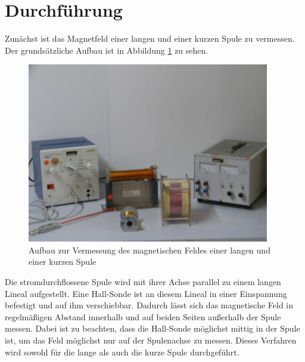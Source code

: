 \section{Durchführung}
\label{sec:Durchführung}
Zunächst ist das Magnetfeld einer langen und einer kurzen Spule zu vermessen.
Der grundsätzliche Aufbau ist in Abbildung \ref{fig:Aufbau_langekurzespule} zu sehen.
\begin{figure}
  \centering
  \includegraphics[width=300pt]{data/aufbau1.png}
  \caption{Aufbau zur Vermessung des magnetischen Feldes einer
  langen und einer kurzen Spule \cite{Versuchsanleitung}}
  \label{fig:Aufbau_langekurzespule}
\end{figure}
Die stromdurchflossene Spule wird mit ihrer Achse parallel zu einem langen Lineal
aufgestellt. Eine Hall-Sonde ist an diesem Lineal in einer Einspannung befestigt und
auf ihm verschiebbar. Dadurch lässt sich das magnetische Feld in regelmäßigen Abstand
innerhalb und auf beiden Seiten außerhalb der Spule messen. Dabei ist zu beachten, dass
die Hall-Sonde möglichst mittig in der Spule ist, um das Feld möglichst nur auf
der Spulenachse zu messen. Dieses Verfahren wird sowohl für die lange als auch die kurze
Spule durchgeführt.

